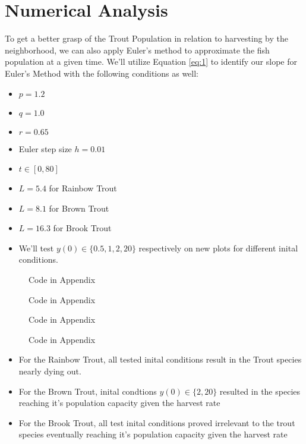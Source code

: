 \documentclass[letterpaper,12pt]{article}
\begin{document}
\section{Numerical Analysis} 
To get a better grasp of the Trout Population in relation to harvesting by the neighborhood, we can also apply Euler's method to approximate the fish population at a given time. 
We'll utilize Equation \eqref{eq:1} to identify our slope for Euler's Method with the following conditions as well:
\begin{itemize}
    \item \(p = 1.2\)
    \item \(q = 1.0\)
    \item \(r = 0.65\)
    \item Euler step size \(h = 0.01\)
    \item \(t \in [0,80]\)
    \item \(L = 5.4\) for Rainbow Trout
    \item \(L = 8.1\) for Brown Trout
    \item \(L = 16.3\) for Brook Trout
    \item We'll test \(y(0) \in \{0.5,1,2,20\}\) respectively on new plots for different inital conditions.
\end{itemize}
\begin{figure}[H]
    \centering
    
    \caption{Code in Appendix}
    \label{fig:7}
\end{figure}
\begin{figure}[H]
    \centering
    
    \caption{Code in Appendix}
    \label{fig:8}
\end{figure}
\begin{figure}[H]
    \centering
    
    \caption{Code in Appendix}
    \label{fig:9}
\end{figure}
\begin{figure}[H]
    \centering
    
    \caption{Code in Appendix}
    \label{fig:10}
\end{figure}
\begin{itemize}
    \item For the Rainbow Trout, all tested inital conditions result in the Trout species nearly dying out.
    \item For the Brown Trout, inital condtions \(y(0) \in \{2, 20\}\) resulted in the species reaching it's population capacity given the harvest rate
    \item For the Brook Trout, all test inital conditions proved irrelevant to the trout species eventually reaching it's population capacity given the harvest rate
\end{itemize}
\end{document}
